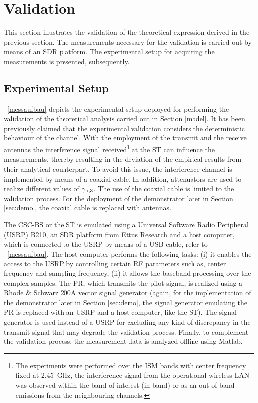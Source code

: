 \section{Validation}
\label{sec:val}
This section illustrates the validation of the theoretical expression derived in the previous section. The measurements necessary for the validation is carried out by means of an SDR platform. The experimental setup for acquiring the measurements is presented, subsequently. 
 
\subsection{Experimental Setup}

\figurename~\ref{messaufbau} depicts the experimental setup deployed for performing the validation of the theoretical analysis carried out in Section \ref{model}. It has been previously claimed that the experimental validation considers the deterministic behaviour of the channel. With the employment of the transmit and the receive antennas the interference signal received\footnote{The experiments were performed over the ISM bands with center frequency fixed at \SI{2.45}{GHz}, the interference signal from the operational wireless LAN was observed within the band of interest (in-band) or as an out-of-band emissions from the neighbouring channels.} at the ST can influence the measurements, thereby resulting in the deviation of the empirical results from their analytical counterpart. To avoid this issue, the interference channel is implemented by means of a coaxial cable. In addition, attenuators are used to realize different values of ${\gamma}_{\text{p,3}}$. The use of the coaxial cable is limited to the validation process. For the deployment of the demonstrator later in Section \ref{sec:demo}, the coaxial cable is replaced with antennas. %

The CSC-BS or the ST is emulated using a Universal Software Radio Peripheral (USRP) B210, an SDR platform from Ettus Research \cite{Ettus} and a host computer, which is connected to the USRP by means of a USB cable, refer to \figurename~\ref{messaufbau}. The host computer performs the following tasks: (i) it enables the access to the USRP by controlling certain RF parameters such as, center frequency and sampling frequency, (ii) it allows the baseband processing over the complex samples. %
The PR, which transmits the pilot signal, is realized using a Rhode $\&$ Schwarz 200A vector signal generator (again, for the implementation of the demonstrator later in Section \ref{sec:demo}, the signal generator emulating the PR is replaced with an USRP and a host computer, like the ST). The signal generator is used instead of a USRP for excluding any kind of discrepancy in the transmit signal that may degrade the validation process. Finally, to complement the validation process, the measurement data is analyzed offline using Matlab.

